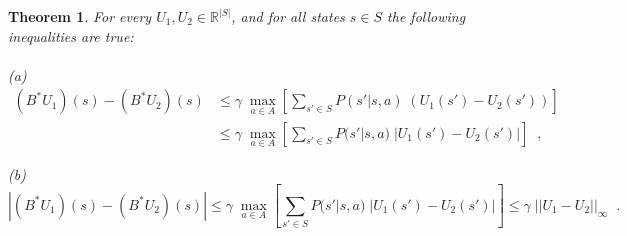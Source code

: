 \documentclass{article}
\newtheorem{theorem}{Theorem}[section]
\theoremstyle{definition}
\theoremstyle{remark}
\begin{document}
\begin{theorem}
For every $U_1, U_2 \in \mathbb{R}^{|S|}$, and for all states $s \in S$ the following inequalities are true:\\
\\
(a)
\begin{equation}
\begin{split}
(B^{\ast}U_1)(s) - (B^{\ast}U_2)(s) & \leq \gamma \; \underset{a \in A}{\max} \left[ \sum_{s' \in S} P(s'|s,a) \; (U_1(s') - U_2(s')) \right] \\
& \leq \gamma \; \underset{a \in A}{\max} \left[ \sum_{s' \in S} P(s'|s,a) \; |U_1(s') - U_2(s')| \right] \;\; ,
\end{split}
\label{eq:bellman-opt-backup-maxinequality1}
\end{equation}

(b)
\begin{equation}
|(B^{\ast}U_1)(s) - (B^{\ast}U_2)(s)| \leq \gamma \; \underset{a \in A}{\max} \left[ \sum_{s' \in S} P(s'|s,a) \; |U_1(s') - U_2(s')| \right] \leq \gamma \; ||U_1 - U_2||_{\infty} \;\; .
\label{eq:bellman-opt-backup-maxinequality2}
\end{equation}
\label{th-bellman-opt-backup-maxinequality}
\end{theorem}
\end{document}
